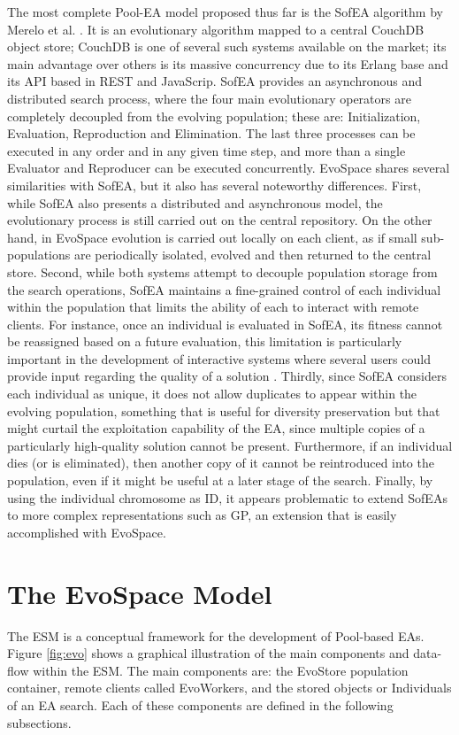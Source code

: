 The most complete Pool-EA model proposed thus far is the SofEA algorithm by Merelo et al. \cite{sofea1,sofea2,sofea3}.
It is an evolutionary algorithm mapped to a central CouchDB object store;
CouchDB is one of several such systems available on the market; its main advantage over others is its massive concurrency due
to its Erlang base and its API based in REST and JavaScrip.
SofEA provides an asynchronous and distributed search process,
where the four main evolutionary operators are completely decoupled from the evolving population; these are: Initialization, Evaluation, Reproduction and Elimination.
The last three processes can be executed in any order and in any given time step, and more than a single Evaluator and Reproducer can be
executed concurrently.
EvoSpace shares several similarities with SofEA, but it also has several noteworthy differences.
First, while SofEA also presents a distributed and asynchronous model, the evolutionary process is still carried out on the central repository.
On the other hand, in EvoSpace evolution is carried out locally on each client, as if small sub-populations are periodically isolated, evolved and then returned to the central store.
Second, while both systems attempt to decouple population storage from the search operations, SofEA maintains a fine-grained control of each individual
within the population that limits the ability of each to interact with remote clients.
For instance, once an individual is evaluated in SofEA, its fitness cannot be reassigned based on a future evaluation,
this limitation is particularly important in the development of interactive systems where several users could provide input regarding the quality of a solution \cite{Musart}.
Thirdly, since SofEA considers each individual as unique, it does not allow duplicates to appear within the evolving population, something that is useful for diversity preservation but that might curtail the exploitation capability of the EA, since multiple copies of a particularly high-quality solution cannot be present.
Furthermore, if an individual dies (or is eliminated), then another copy of it cannot be reintroduced into the population,
even if it might be useful at a later stage of the search.
Finally, by using the individual chromosome as ID, it appears problematic to extend SofEAs to more complex representations such as GP,
an extension that is easily accomplished with EvoSpace.

\section{The EvoSpace Model} %
\label{sec:evospace}
The ESM is a conceptual framework for the development of Pool-based EAs. Figure \ref{fig:evo} shows a graphical illustration of the main components and data-flow within the ESM. The main components are: the EvoStore population container, remote clients called EvoWorkers, and the stored objects or Individuals of an EA search.
Each of these components are defined in the following subsections.

